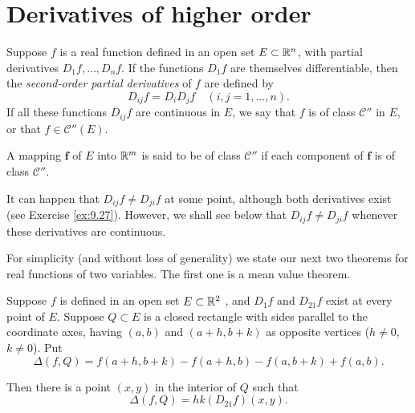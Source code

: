 
\section{Derivatives of higher order}

\begin{mydef}
    \label{mydef:9.39}
    Suppose $f$ is a real function defined in an open set $E \subset {\protect\mathbb R}^n$,
    with partial derivatives $D_1 f, \dots , D_n f$.
    If the functions $D_1 f$ are themselves differentiable,
    then the \emph{second-order partial derivatives} of $f$ are defined by
    \begin{equation*}
        D_{ij}f = D_i D_j f
        \quad
        (i,j=1, ... ,n) .
    \end{equation*}
    If all these functions $D_{ij} f$ are continuous in $E$,
    we say that $f$ is of class $\mathscr{C}''$ in $E$,
    or that $f \in \mathscr{C}''(E)$.

    A mapping $\mathbf{f}$ of $E$ into ${\protect\mathbb R}^m$ is said to be of class $\mathscr{C}''$ if each component of $\mathbf{f}$ is of class $\mathscr{C}''$.

    It can happen that $D_{ij}f \neq D_{ji}f$ at some point, although both derivatives exist (see Exercise \ref{ex:9.27}).
    However, we shall see below that $D_{ij}f \neq D_{ji}f$ whenever these derivatives are continuous.

    For simplicity (and without loss of generality) we state our next two
    theorems for real functions of two variables.
    The first one is a mean value theorem.
\end{mydef}

\begin{thm}
    \label{thm:9.40}
    Suppose $f$ is defined in an open set $E \subset {\protect\mathbb R}^2$ ,
    and $D_{1}f$ and $D_{21}f$ exist at every point of $E$.
    Suppose $Q \subset E$ is a closed rectangle with sides parallel to the coordinate axes, having $(a, b)$ and $(a +h, b + k)$ as opposite vertices ($h \neq 0$, $k \neq 0$). Put
    \begin{equation*}
        \Delta (f, Q) = f(a + h, b + k) - f(a + h, b) - f(a, b + k) + f(a, b).
    \end{equation*}

    Then there is a point $(x, y)$ in the interior of $Q$ such that
    \begin{equation}
        \label{eq:9.95}
        \Delta (f, Q) = hk(D_{21}f)(x, y).
    \end{equation}
\end{thm}

